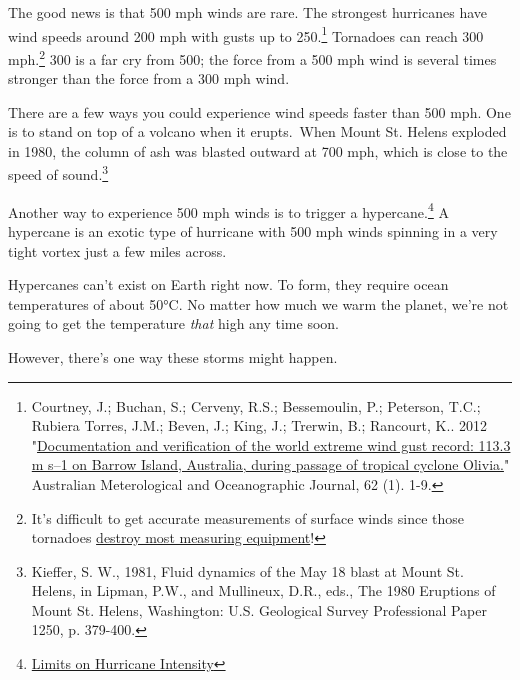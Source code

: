 {{The good news is that 500 mph winds are rare. The strongest hurricanes have wind speeds around 200 mph with gusts up to 250.{\footnote{Courtney, J.; Buchan, S.; Cerveny, R.S.; Bessemoulin, P.; Peterson, T.C.; Rubiera Torres, J.M.; Beven, J.; King, J.; Trerwin, B.; Rancourt, K.. 2012 "\href{http://www.bom.gov.au/amoj/docs/2012/courtney\_hres.pdf}{Documentation and verification of the world extreme wind gust record: 113.3 m s–1 on Barrow Island, Australia, during passage of tropical cyclone Olivia.}" Australian Meterological and Oceanographic Journal, 62 (1). 1-9.} } Tornadoes can reach 300 mph.{\footnote{It's difficult to get accurate measurements of surface winds since those tornadoes \href{http://www.spc.noaa.gov/faq/tornado/\#History} {destroy most measuring equipment}!} } 300 is a far cry from 500; the force from a 500 mph wind is several times stronger than the force from a 300 mph wind.}

{There are a few ways you could experience wind speeds faster than 500 mph. One is to stand on top of a volcano when it erupts. When Mount St. Helens exploded in 1980, the column of ash was blasted outward at 700 mph, which is close to the speed of sound.{\footnote{Kieffer, S. W., 1981, Fluid dynamics of the May 18 blast at Mount St. Helens, in Lipman, P.W., and Mullineux, D.R., eds., The 1980 Eruptions of Mount St. Helens, Washington: U.S. Geological Survey Professional Paper 1250, p. 379-400.} } }

{Another way to experience 500 mph winds is to trigger a hypercane.{\footnote{ \href{http://wind.mit.edu/\~emanuel/holem/holem.html}{Limits on Hurricane Intensity}} } A hypercane is an exotic type of hurricane with 500 mph winds spinning in a very tight vortex just a few miles across.}

{Hypercanes can't exist on Earth right now. To form, they require ocean temperatures of about 50°C. No matter how much we warm the planet, we're not going to get the temperature \emph{that} high any time soon.}

{However, there's one way these storms might happen.}

}
